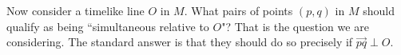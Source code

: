 \documentclass [12] {article}
\theoremstyle{plain}
\numberwithin{figure}{subsection}
\numberwithin{proposition}{subsection}
\begin{document}

Now consider a timelike line $O$ in $M$. What pairs of points $(p, q)$ in  $M$ should qualify as being ``simultaneous relative to $O$"?  That is the question we are considering.    The standard answer is that they should do so precisely if $\overrightarrow{pq} \perp O$.  
\end{document}

